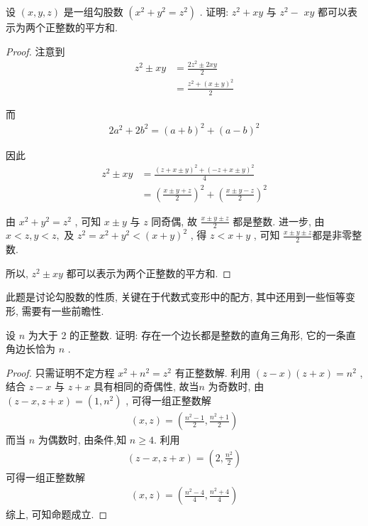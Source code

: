 \begin{example}
	设 $(x, y, z)$ 是一组勾股数 $\left(x^{2}+y^{2}=z^{2}\right)$ . 证明: $z^{2}+x y$ 与 $z^{2}-$ $x y$ 都可以表示为两个正整数的平方和.
\end{example}
\begin{proof}
	注意到
	\begin{align}
		z^{2} \pm x y & =\frac{2 z^{2} \pm 2 x y}{2}   \\
		              & =\frac{z^{2}+(x \pm y)^{2}}{2}
	\end{align}

	而
	\begin{align*}
		2 a^{2}+2 b^{2}=(a+b)^{2}+(a-b)^{2}
	\end{align*}

	因此\begin{align}
		z^{2} \pm x y & =\frac{(z+x \pm y)^{2}+(-z+x \pm y)^{2}}{4}                                \\
		              & =\left(\frac{x \pm y+z}{2}\right)^{2}+\left(\frac{x \pm y-z}{2}\right)^{2}
	\end{align}

	由 $x^{2}+y^{2}=z^{2}$ , 可知 $x \pm y$ 与 $z$ 同奇偶, 故 $\frac{x \pm y \pm z}{2}$ 都是整数. 进一步, 由 $x<z, y<z , $ 及 $z^{2}=x^{2}+y^{2}<(x+y)^{2}$ , 得 $z<x+y$ , 可知 $\frac{x \pm y \pm z}{2}$都是非零整数.

	所以,  $z^{2} \pm x y$ 都可以表示为两个正整数的平方和.
\end{proof}
\begin{note}
	此题是讨论勾股数的性质, 关键在于代数式变形中的配方, 其中还用到一些恒等变形, 需要有一些前瞻性.
\end{note}

\begin{example}
	设 $n$ 为大于 2 的正整数. 证明: 存在一个边长都是整数的直角三角形, 它的一条直角边长恰为 $n$ .
\end{example}
\begin{proof}
	只需证明不定方程 $x^{2}+n^{2}=z^{2}$ 有正整数解.
	利用 $(z-x)(z+x)=n^{2}$ , 结合 $z-x$ 与 $z+x$ 具有相同的奇偶性, 故当$n$ 为奇数时, 由 $(z-x, z+x)=\left(1, n^{2}\right)$ , 可得一组正整数解
	\begin{align*}
		(x, z)=\left(\frac{n^{2}-1}{2}, \frac{n^{2}+1}{2}\right)
	\end{align*}
	而当 $n$ 为偶数时, 由条件,知 $n \geqslant 4$. 利用
	\begin{align*}
		(z-x, z+x)=\left(2, \frac{n^{2}}{2}\right)
	\end{align*}
	可得一组正整数解
	\begin{align*}
		(x, z)=\left(\frac{n^{2}-4}{4}, \frac{n^{2}+4}{4}\right)
	\end{align*}
	综上, 可知命题成立.
\end{proof}

